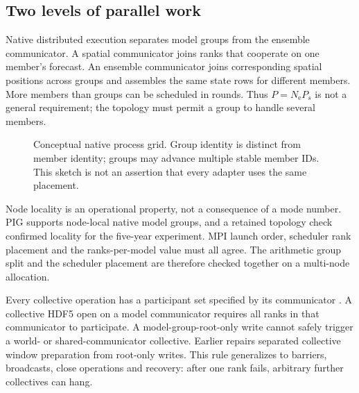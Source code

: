 \documentclass[11pt,a4paper]{article}
\newcommand{\Ne}{N_{\mathrm e}}
\begin{document}
\subsection{Two levels of parallel work}
Native distributed execution separates model groups from the ensemble communicator. A spatial communicator joins ranks that cooperate on one member's forecast. An ensemble communicator joins corresponding spatial positions across groups and assembles the same state rows for different members. More members than groups can be scheduled in rounds. Thus \(P=\Ne P_s\) is not a general requirement; the topology must permit a group to handle several members.

\begin{figure}[htbp]\centering
{}
\caption{Conceptual native process grid. Group identity is distinct from member identity; groups may advance multiple stable member IDs. This sketch is not an assertion that every adapter uses the same placement.}\label{fig:topology}
\end{figure}

Node locality is an operational property, not a consequence of a mode number. PIG supports node-local native model groups, and a retained topology check confirmed locality for the five-year experiment. MPI launch order, scheduler rank placement and the ranks-per-model value must all agree. The arithmetic group split and the scheduler placement are therefore checked together on a multi-node allocation.

Every collective operation has a participant set specified by its communicator \citep{mpiforum2025}. A collective HDF5 open on a model communicator requires all ranks in that communicator to participate. A model-group-root-only write cannot safely trigger a world- or shared-communicator collective. Earlier repairs separated collective window preparation from root-only writes. This rule generalizes to barriers, broadcasts, close operations and recovery: after one rank fails, arbitrary further collectives can hang.
\end{document}
